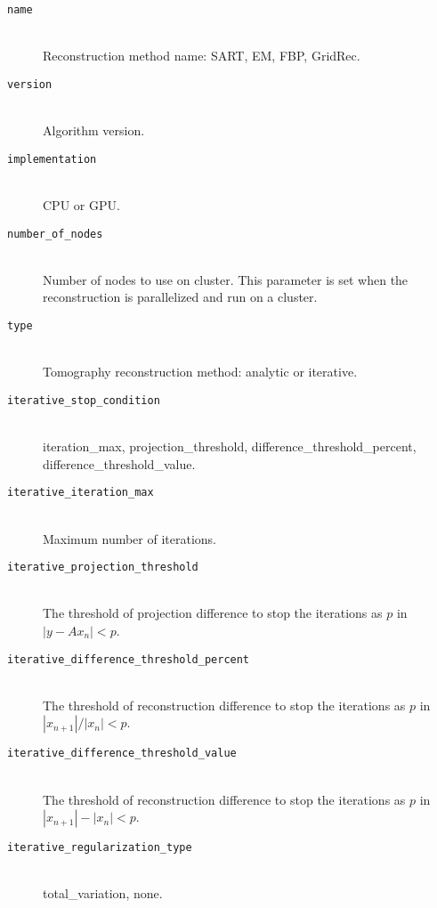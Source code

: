 \begin{description}
\item[\tt{name}] \hfill \\
{Reconstruction method name: SART, EM, FBP, GridRec.}

\item[\tt{version}] \hfill \\
{Algorithm version.}

\item[\tt{implementation}] \hfill \\
{CPU or GPU.}

\item[\tt{number\_of\_nodes}] \hfill \\
{Number of nodes to use on cluster. This parameter is set when the reconstruction is parallelized and run on a cluster.}

\item[\tt{type}] \hfill \\
{Tomography reconstruction method: analytic or iterative.}

\item[\tt{iterative\_stop\_condition}] \hfill \\
{iteration\_max, projection\_threshold, difference\_threshold\_percent, difference\_threshold\_value.}

\item[\tt{iterative\_iteration\_max}] \hfill \\
{Maximum number of iterations.}

\item[\tt{iterative\_projection\_threshold}] \hfill \\
{The threshold of projection difference to stop the iterations as $p$ in $ |y - Ax_n| < p $.}

\item[\tt{iterative\_difference\_threshold\_percent}] \hfill \\
{The threshold of reconstruction difference to stop the iterations as $p$ in $ |x_{n+1}| / |x_n| < p $.}

\item[\tt{iterative\_difference\_threshold\_value}] \hfill \\
{The threshold of reconstruction difference to stop the iterations as $p$ in $ |x_{n+1}| - |x_n| < p $.}

\item[\tt{iterative\_regularization\_type}] \hfill \\
{total\_variation, none.}


\end{description}

